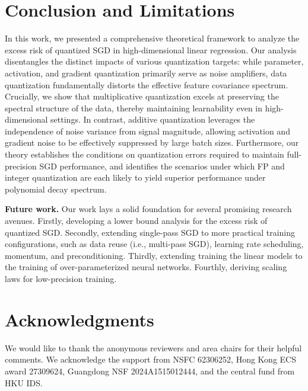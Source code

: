 \documentclass[11pt, letterpaper]{article}
\begin{document}
\section{Conclusion and Limitations}
In this work, we presented a comprehensive theoretical framework to analyze the excess risk of quantized SGD in high-dimensional linear regression. Our analysis disentangles the distinct impacts of various quantization targets: while parameter, activation, and gradient quantization primarily serve as noise amplifiers, data quantization fundamentally distorts the effective feature covariance spectrum. Crucially, we show that multiplicative quantization excels at preserving the spectral structure of the data, thereby maintaining learnability even in high-dimensional settings. In contrast, additive quantization leverages the independence of noise variance from signal magnitude, allowing activation and gradient noise to be effectively suppressed by large batch sizes. Furthermore, our theory establishes the conditions on quantization errors required to maintain full-precision SGD performance, and identifies the scenarios under which FP and integer quantization are each likely to yield superior performance under polynomial decay spectrum.

\textbf{Future work.} Our work lays a solid foundation for several promising research avenues. Firstly, developing a lower bound analysis for the excess risk of quantized SGD. Secondly, extending single-pass SGD to more practical training configurations, such as data reuse (i.e., multi-pass SGD), learning rate scheduling, momentum, and preconditioning. Thirdly, extending training the linear models to the training of over-parameterized neural networks. Fourthly, deriving scaling laws for low-precision training.

\section*{Acknowledgments} We would like to thank the anonymous reviewers and area chairs for their helpful comments. We acknowledge the support from NSFC 62306252, Hong Kong ECS award 27309624, Guangdong NSF
2024A1515012444, and the central fund from HKU IDS.

\end{document}

